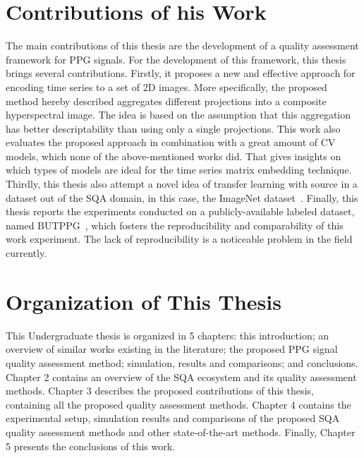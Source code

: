 \section{Contributions of his Work}
\label{sec:my_work}

The main contributions of this thesis are the development of a quality assessment framework for \gls{PPG} signals. For the development of this framework, this thesis brings several contributions. Firstly, it proposes a new and effective approach for encoding time series to a set of 2D images. More specifically, the proposed method hereby described aggregates different projections into a composite hyperspectral image. The idea is based on the assumption that this aggregation has better descriptability than using only a single projections. This work also evaluates the proposed approach in combination with a great amount of \gls{CV} models, which none of the above-mentioned works did. That gives insights on which types of models are ideal for the time series matrix embedding technique. Thirdly, this thesis also attempt a novel idea of transfer learning with source in a dataset out of the \gls{SQA} domain, in this case, the ImageNet dataset~\cite{ImageNet}. Finally, this thesis reports the experiments conducted on a publicly-available labeled dataset, named \gls{BUTPPG}~\cite{butppg}, which fosters the reproducibility and comparability of this work experiment. The lack of reproducibility is a noticeable problem in the field currently.

\section{Organization of This Thesis}
\label{sec:organization}

This Undergraduate thesis is organized in 5 chapters: this introduction; an overview of similar works existing in the literature; the proposed \gls{PPG} signal quality assessment method; simulation, results and comparisons; and conclusions. Chapter 2 contains an overview of the \gls{SQA} ecosystem and its quality assessment methods. Chapter 3 describes the proposed contributions of this thesis, containing all the proposed quality assessment methods. Chapter 4 contains the experimental setup, simulation results and comparisons of the proposed \gls{SQA} quality assessment methods and other state-of-the-art methods. Finally, Chapter 5 presents the conclusions of this work.